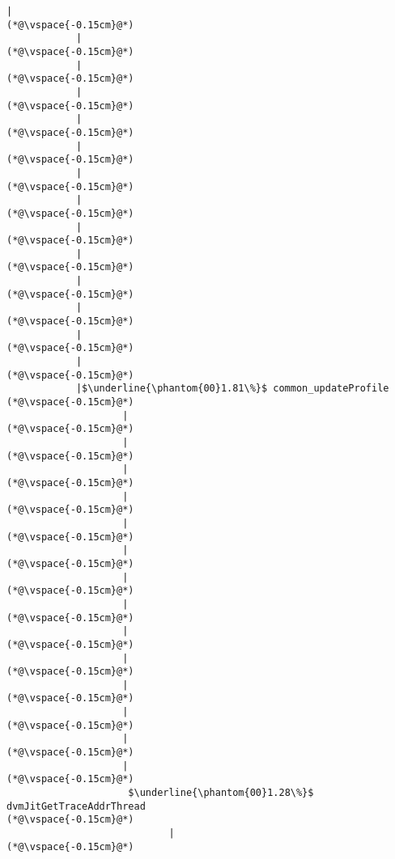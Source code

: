 \begin{lstlisting}[caption=Staattinen metodi Java$\to$C , label=profile:J2CBenchmark00001, numberbychapter=true, frame=lines, float, floatplacement=t]
            |
(*@\vspace{-0.15cm}@*)
            |
(*@\vspace{-0.15cm}@*)
            |
(*@\vspace{-0.15cm}@*)
            |
(*@\vspace{-0.15cm}@*)
            |
(*@\vspace{-0.15cm}@*)
            |
(*@\vspace{-0.15cm}@*)
            |
(*@\vspace{-0.15cm}@*)
            |
(*@\vspace{-0.15cm}@*)
            |
(*@\vspace{-0.15cm}@*)
            |
(*@\vspace{-0.15cm}@*)
            |
(*@\vspace{-0.15cm}@*)
            |
(*@\vspace{-0.15cm}@*)
            |
(*@\vspace{-0.15cm}@*)
            |
(*@\vspace{-0.15cm}@*)
            |$\underline{\phantom{00}1.81\%}$ common_updateProfile
(*@\vspace{-0.15cm}@*)
                    |
(*@\vspace{-0.15cm}@*)
                    |
(*@\vspace{-0.15cm}@*)
                    |
(*@\vspace{-0.15cm}@*)
                    |
(*@\vspace{-0.15cm}@*)
                    |
(*@\vspace{-0.15cm}@*)
                    |
(*@\vspace{-0.15cm}@*)
                    |
(*@\vspace{-0.15cm}@*)
                    |
(*@\vspace{-0.15cm}@*)
                    |
(*@\vspace{-0.15cm}@*)
                    |
(*@\vspace{-0.15cm}@*)
                    |
(*@\vspace{-0.15cm}@*)
                    |
(*@\vspace{-0.15cm}@*)
                    |
(*@\vspace{-0.15cm}@*)
                    |
(*@\vspace{-0.15cm}@*)
                     $\underline{\phantom{00}1.28\%}$ dvmJitGetTraceAddrThread
(*@\vspace{-0.15cm}@*)
                            |
(*@\vspace{-0.15cm}@*)

\end{lstlisting}

